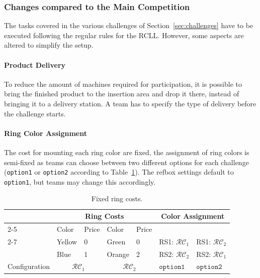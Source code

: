\documentclass[12pt,twoside]{article}
\newcommand{\refsec}[1]{Section~\ref{#1}}
\newcommand{\reftab}[1]{Table~\ref{#1}}
\begin{document}
\subsubsection{Changes compared to the Main Competition}
The tasks covered in the various challenges of \refsec{sec:challenges} have to
be executed following the regular rules for the \ac{RCLL}.
However, some aspects are altered to simplify the setup.

\paragraph{Product Delivery}
To reduce the amount of machines required for participation, it is possible to
bring the finished product to the insertion area and drop it there, instead of
bringing it to a delivery station. A team has to specify the type of delivery
before the challenge starts.

\paragraph{Ring Color Assignment}
The cost for mounting each ring color are fixed, the assignment of ring colors
is semi-fixed as teams can choose between two different options for each
challenge (\texttt{option1} or \texttt{option2} according to
\reftab{tab:ring-costs}).
The \ac{refbox} settings default to \texttt{option1}, but teams may change this
accordingly.

\newcommand{\colconfig}{\mathcal{RC}}
\begin{table}[!htb]
 \centering
 \begin{tabular}{l|l|l||l|l||l|l}
  & \multicolumn{4}{c||}{Ring Costs}
  & \multicolumn{2}{c}{\multirow{2}{*}{Color Assignment }}\\\cline{2-5}
  & Color  & Price & Color  & Price & \multicolumn{2}{c}{}\\\cline{2-7}
  & Yellow & 0 & Green & 0
  & \ac{RS}1: $\colconfig_1$ & \ac{RS}1: $\colconfig_2$ \\
  & Blue  & 1 & Orange & 2
  & \ac{RS}2: $\colconfig_2$ & \ac{RS}2: $\colconfig_1$ \\\hline\hline
  Configuration & \multicolumn{2}{c||}{$\colconfig_1$}
  & \multicolumn{2}{c||}{$\colconfig_2$}
  & $\texttt{option1}$ & $\texttt{option2}$\\
 \end{tabular}
 \caption{Fixed ring costs.}
 \label{tab:ring-costs}
\end{table}
\end{document}
